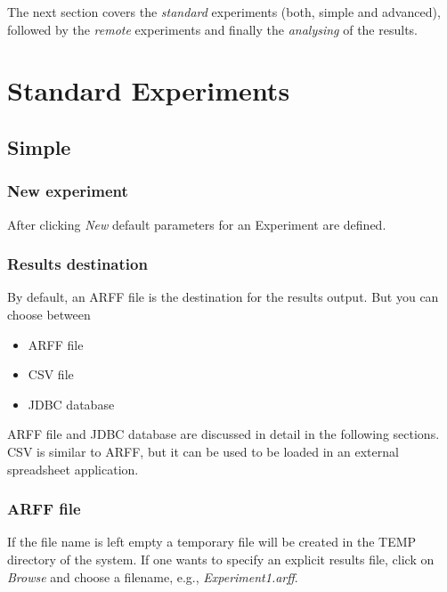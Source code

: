 The next section covers the \textit{standard} experiments (both, simple and advanced), followed by the \textit{remote} experiments and finally the \textit{analysing} of the results.



\newpage
\section{Standard Experiments}


\subsection{Simple}

\subsubsection{New experiment}

After clicking \textit{New} default parameters for an Experiment are defined.

\begin{center}
\end{center}


\subsubsection{Results destination}

By default, an ARFF file is the destination for the results output. But you can choose between

\begin{itemize}
	\item ARFF file
   \item CSV file
   \item JDBC database 
\end{itemize}

ARFF file and JDBC database are discussed in detail in the following sections. CSV is similar to ARFF, but it can be used to be loaded in an external spreadsheet application.


\subsubsection*{ARFF file}

If the file name is left empty a temporary file will be created in the TEMP directory of the system. If one wants to specify an explicit results file, click on \textit{Browse} and choose a filename, e.g., \textit{Experiment1.arff}.


